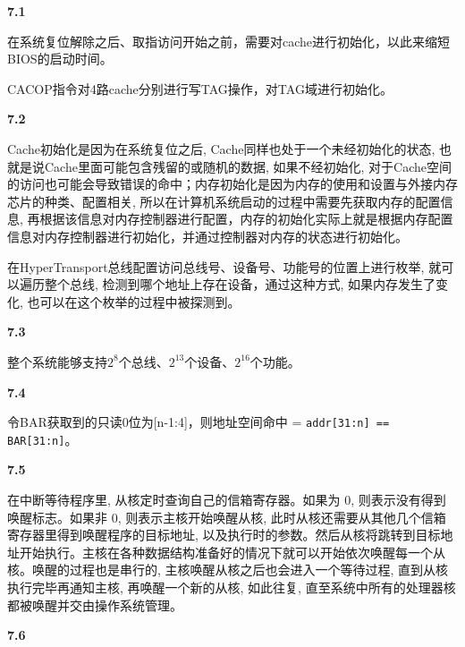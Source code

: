 \documentclass[UTF8]{report}
\begin{document}
\pagestyle{fancy}

\maketitle

\noindent
\textbf{7.1}

在系统复位解除之后、取指访问开始之前，需要对cache进行初始化，以此来缩短BIOS的启动时间。

CACOP指令对4路cache分别进行写TAG操作，对TAG域进行初始化。

\noindent
\textbf{7.2}

Cache初始化是因为在系统复位之后, Cache同样也处于一个未经初始化的状态, 也就是说Cache里面可能包含残留的或随机的数据, 如果不经初始化, 对于Cache空间的访问也可能会导致错误的命中；内存初始化是因为内存的使用和设置与外接内存芯片的种类、配置相关, 所以在计算机系统启动的过程中需要先获取内存的配置信息, 再根据该信息对内存控制器进行配置，内存的初始化实际上就是根据内存配置信息对内存控制器进行初始化，并通过控制器对内存的状态进行初始化。

在HyperTransport总线配置访问总线号、设备号、功能号的位置上进行枚举, 就可以遍历整个总线, 检测到哪个地址上存在设备，通过这种方式, 如果内存发生了变化, 也可以在这个枚举的过程中被探测到。

\noindent
\textbf{7.3}

整个系统能够支持$2^8$个总线、$2^13$个设备、$2^16$个功能。

\noindent
\textbf{7.4}

令BAR获取到的只读0位为[n-1:4]，则地址空间命中 = \texttt{addr[31:n] == BAR[31:n]}。

\noindent
\textbf{7.5}

在中断等待程序里, 从核定时查询自己的信箱寄存器。如果为 0, 则表示没有得到唤醒标志。如果非 0, 则表示主核开始唤醒从核, 此时从核还需要从其他几个信箱寄存器里得到唤醒程序的目标地址, 以及执行时的参数。然后从核将跳转到目标地址开始执行。主核在各种数据结构准备好的情况下就可以开始依次唤醒每一个从核。唤醒的过程也是串行的, 主核唤醒从核之后也会进入一个等待过程, 直到从核执行完毕再通知主核, 再唤醒一个新的从核, 如此往复, 直至系统中所有的处理器核都被唤醒并交由操作系统管理。

\noindent
\textbf{7.6}
\end{document}
